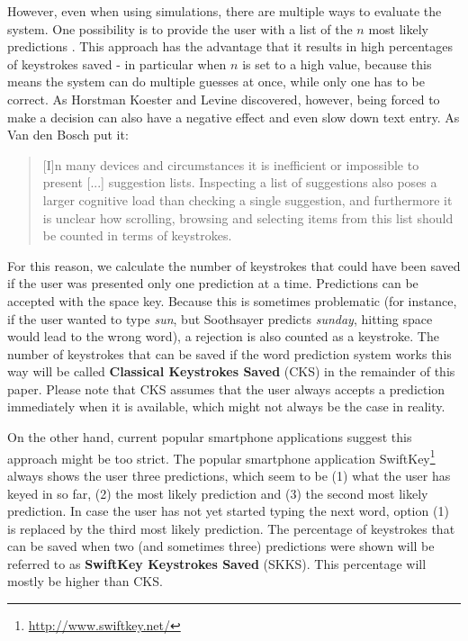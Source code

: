 \documentclass[12pt]{article}
\begin{document}
However, even when using simulations, there are multiple ways to evaluate the system. One possibility is to provide the user with a list of the $n$ most likely predictions \cite{Lesher+99,Fazly+03}. This approach has the advantage that it results in high percentages of keystrokes saved - in particular when $n$ is set to a high value, because this means the system can do multiple guesses at once, while only one has to be correct. As Horstman Koester and Levine \citeyear{Horstmann-Koester+96} discovered, however, being forced to make a decision can also have a negative effect and even slow down text entry. As Van den Bosch \citeyear{vandenbosch11} put it: 

\begin{quotation}
[I]n many devices and circumstances it is inefficient or impossible to present [...] suggestion lists. Inspecting a list of suggestions also poses a larger cognitive load than checking a single suggestion, and furthermore it is unclear how scrolling, browsing and selecting items from this list should be counted in terms of keystrokes.
\end{quotation}

For this reason, we calculate the number of keystrokes that could have been saved if the user was presented only one prediction at a time. Predictions can be accepted with the space key. Because this is sometimes problematic (for instance, if the user wanted to type \emph{sun}, but Soothsayer predicts \emph{sunday}, hitting space would lead to the wrong word), a rejection is also counted as a keystroke. The number of keystrokes that can be saved if the word prediction system works this way will be called \textbf{Classical Keystrokes Saved} (CKS) in the remainder of this paper. Please note that CKS assumes that the user always accepts a prediction immediately when it is available, which might not always be the case in reality.

On the other hand, current popular smartphone applications suggest this approach might be too strict. The popular smartphone application SwiftKey\footnote{\url{http://www.swiftkey.net/}} always shows the user three predictions, which seem to be (1) what the user has keyed in so far, (2) the most likely prediction and (3) the second most likely prediction. In case the user has not yet started typing the next word, option (1) is replaced by the third most likely prediction. The percentage of keystrokes that can be saved when two (and sometimes three) predictions were shown will be referred to as \textbf{SwiftKey Keystrokes Saved} (SKKS). This percentage will mostly be higher than CKS.
\end{document}
